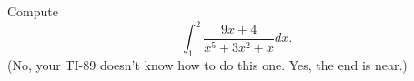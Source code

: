 Compute \[\int_1^2\dfrac{9x+4}{x^5+3x^2+x}dx.\]
(No, your TI-89 doesn’t know how to do this one. Yes, the end is near.)